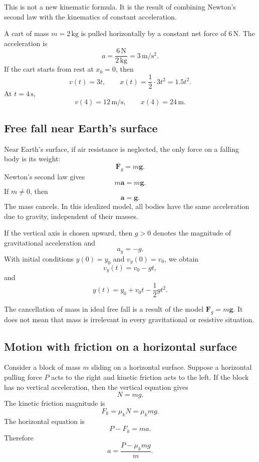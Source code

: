 This is not a new kinematic formula. It is the result of combining Newton's second law with the kinematics of constant acceleration.

\begin{examplebox}
A cart of mass \(m=2\,\mathrm{kg}\) is pulled horizontally by a constant net force of \(6\,\mathrm{N}\). The acceleration is
\[
a=\frac{6\,\mathrm{N}}{2\,\mathrm{kg}}=3\,\mathrm{m/s^2}.
\]
If the cart starts from rest at \(x_0=0\), then
\[
v(t)=3t,
\qquad
x(t)=\frac{1}{2}\cdot 3t^2=1.5t^2.
\]
At \(t=4\,\mathrm{s}\),
\[
v(4)=12\,\mathrm{m/s},
\qquad
x(4)=24\,\mathrm{m}.
\]
\end{examplebox}

\subsection{Free fall near Earth's surface}

Near Earth's surface, if air resistance is neglected, the only force on a falling body is its weight:
\[
\mathbf{F}_g=m\mathbf{g}.
\]
Newton's second law gives
\[
 m\mathbf{a}=m\mathbf{g}.
\]
If \(m\neq 0\), then
\[
\mathbf{a}=\mathbf{g}.
\]
The mass cancels. In this idealized model, all bodies have the same acceleration due to gravity, independent of their masses.

If the vertical axis is chosen upward, then \(g>0\) denotes the magnitude of gravitational acceleration and
\[
a_y=-g.
\]
With initial conditions \(y(0)=y_0\) and \(v_y(0)=v_0\), we obtain
\[
v_y(t)=v_0-gt,
\]
and
\[
y(t)=y_0+v_0t-\frac{1}{2}gt^2.
\]

\begin{remarkbox}
The cancellation of mass in ideal free fall is a result of the model \(\mathbf{F}_g=m\mathbf{g}\). It does not mean that mass is irrelevant in every gravitational or resistive situation.
\end{remarkbox}

\subsection{Motion with friction on a horizontal surface}

Consider a block of mass \(m\) sliding on a horizontal surface. Suppose a horizontal pulling force \(P\) acts to the right and kinetic friction acts to the left. If the block has no vertical acceleration, then the vertical equation gives
\[
N=mg.
\]
The kinetic friction magnitude is
\[
F_k=\mu_k N=\mu_k mg.
\]
The horizontal equation is
\[
P-F_k=ma.
\]
Therefore
\[
a=\frac{P-\mu_k mg}{m}.
\]

